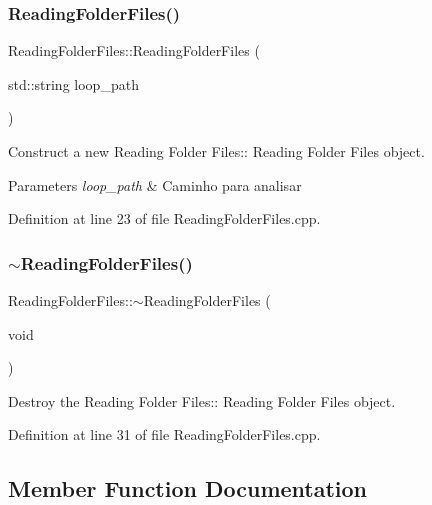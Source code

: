 \subsubsection{\texorpdfstring{Reading\+Folder\+Files()}{ReadingFolderFiles()}}
{\footnotesize\ttfamily Reading\+Folder\+Files\+::\+Reading\+Folder\+Files (\begin{DoxyParamCaption}\item[{std\+::string}]{loop\+\_\+path }\end{DoxyParamCaption})}



Construct a new Reading Folder Files\+:\+: Reading Folder Files object. 


\begin{DoxyParams}{Parameters}
{\em loop\+\_\+path} & Caminho para analisar \\
\hline
\end{DoxyParams}


Definition at line 23 of file Reading\+Folder\+Files.\+cpp.

\mbox{\label{class_reading_folder_files_a59560f57a763b2acfe78663a54f9c343}} 
\subsubsection{\texorpdfstring{$\sim$\+Reading\+Folder\+Files()}{~ReadingFolderFiles()}}
{\footnotesize\ttfamily Reading\+Folder\+Files\+::$\sim$\+Reading\+Folder\+Files (\begin{DoxyParamCaption}\item[{void}]{ }\end{DoxyParamCaption})}



Destroy the Reading Folder Files\+:\+: Reading Folder Files object. 



Definition at line 31 of file Reading\+Folder\+Files.\+cpp.



\subsection{Member Function Documentation}
\mbox{\label{class_reading_folder_files_ae4eb52dbef433f34d5ccee66ebc02855}} 
